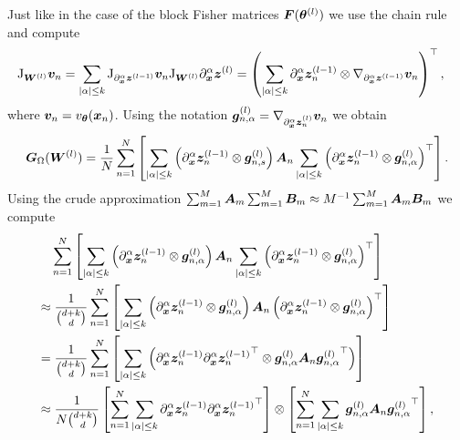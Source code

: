 Just like in the case of the block Fisher matrices ${\bm{F}}({\bm{\theta}}^{(l)})$ we use the chain rule and compute
\begin{align*}
    \mathrm{J}_{{\bm{W}}^{(l)}} {\bm{v}}_n & = \sum_{\lvert \alpha \rvert\le k}\mathrm{J}_{\partial_{\bm{x}}^\alpha {\bm{z}}^{(l-1)}}{\bm{v}}_n \mathrm{J}_{{\bm{W}}^{(l)}} \partial_{\bm{x}}^\alpha {\bm{z}}^{(l)} = 
    \left(\sum_{\lvert \alpha \rvert\le k} \partial_{\bm{x}}^\alpha {\bm{z}}^{(l-1)}_n \otimes \nabla_{\partial_{\bm{x}}^\alpha {\bm{z}}^{(l-1)}} {\bm{v}}_n\right)^\top,
\end{align*}
where ${\bm{v}}_n = v_{\bm{\theta}}({\bm{x}}_n)$. 
Using the notation ${\bm{g}}^{(l)}_{n,\alpha} = \nabla_{\partial_{\bm{x}}^\alpha {\bm{z}}_n^{(l)}} {\bm{v}}_n$ we obtain
\begin{equation}\label{eq:laplace_gramian_block_exact}
    {\bm{G}}_\Omega({\bm{W}}^{(l)})
    =
    \frac1N\sum_{n=1}^N
    \left[\sum_{\lvert \alpha \rvert\le k} \left( \partial_{\bm{x}}^\alpha {\bm{z}}^{(l-1)}_n \otimes {\bm{g}}_{n,s}^{(l)} \right)
    {\bm{A}}_n 
    \sum_{\lvert \alpha \rvert\le k} \left( \partial_{\bm{x}}^\alpha {\bm{z}}^{(l-1)}_n \otimes {\bm{g}}_{n,\alpha}^{(l)} \right)^\top\right]. 
\end{equation}
Using the crude approximation $\sum_{m=1}^M {\bm{A}}_m\sum_{m=1}^M {\bm{B}}_m \approx M^{-1}\sum_{m=1}^M {\bm{A}}_m {\bm{B}}_m$ we compute 
\begin{align}
    \begin{split}
        & \sum_{n=1}^N
    \left[\sum_{\lvert \alpha \rvert\le k} \left( \partial_{\bm{x}}^\alpha {\bm{z}}^{(l-1)}_n\otimes {\bm{g}}_{n,\alpha}^{(l)} \right)
    {\bm{A}}_n
    \sum_{\lvert \alpha \rvert\le k} \left( \partial_{\bm{x}}^\alpha {\bm{z}}^{(l-1)}_n\otimes {\bm{g}}_{n,\alpha}^{(l)} \right)^\top\right]
    \\ \approx & \;
    \frac{1}{\binom{d+k}{d}} \sum_{n=1}^N
    \left[\sum_{\lvert \alpha \rvert\le k} \left( \partial_{\bm{x}}^\alpha {\bm{z}}^{(l-1)}_n \otimes {\bm{g}}_{n,\alpha}^{(l)} \right)
    {\bm{A}}_n
    \left( \partial_{\bm{x}}^\alpha {\bm{z}}^{(l-1)}_n \otimes {\bm{g}}_{n,\alpha}^{(l)} \right)^\top\right]
    \\ = & \;
    \frac{1}{\binom{d+k}{d}}\sum_{n=1}^N
    \left[\sum_{\lvert \alpha \rvert\le k} \left( \partial_{\bm{x}}^\alpha {\bm{z}}^{(l-1)}_n{\partial_{\bm{x}}^\alpha {\bm{z}}^{(l-1)}_n}^\top\otimes {\bm{g}}_{n,\alpha}^{(l)} {\bm{A}}_n{{\bm{g}}_{n,\alpha}^{(l)}}^\top \right)
    \right]
    \\ \approx & \;
    \frac{1}{N\binom{d+k}{d}}\left[\sum_{n=1}^N \sum_{\lvert \alpha \rvert\le k} \partial_{\bm{x}}^\alpha {\bm{z}}^{(l-1)}_n{\partial_{\bm{x}}^\alpha {\bm{z}}^{(l-1)}_n}^\top \right]
    \otimes
    \left[\sum_{n=1}^N\sum_{\lvert \alpha \rvert\le k} {\bm{g}}^{(l)}_{n,\alpha}{\bm{A}}_n{{\bm{g}}^{(l)}_{n,\alpha}}^\top \right],
    \end{split}
\end{align}
